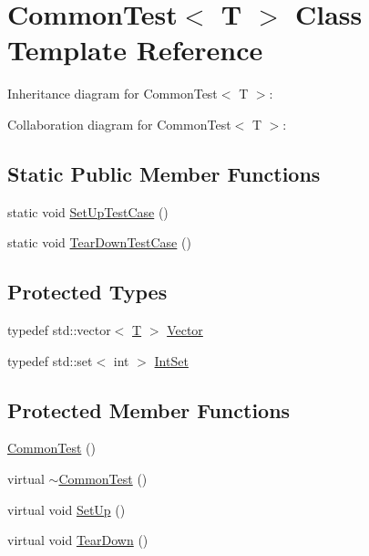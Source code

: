 \hypertarget{class_common_test}{}\section{Common\+Test$<$ T $>$ Class Template Reference}
\label{class_common_test}


Inheritance diagram for Common\+Test$<$ T $>$\+:


Collaboration diagram for Common\+Test$<$ T $>$\+:
\subsection*{Static Public Member Functions}
\begin{DoxyCompactItemize}
\item 
static void \hyperlink{class_common_test_a6edd90f32f45cc49e4a423b22bd770ce}{Set\+Up\+Test\+Case} ()
\item 
static void \hyperlink{class_common_test_a68d2bf5108cf28478331588fbdff4838}{Tear\+Down\+Test\+Case} ()
\end{DoxyCompactItemize}
\subsection*{Protected Types}
\begin{DoxyCompactItemize}
\item 
typedef std\+::vector$<$ \hyperlink{functions__7_8js_adf1f3edb9115acb0a1e04209b7a9937b}{T} $>$ \hyperlink{class_common_test_a6dfdcede6964887b9f4254a0e0478e37}{Vector}
\item 
typedef std\+::set$<$ int $>$ \hyperlink{class_common_test_a62827e9d3064cddf4a8698747f1bd434}{Int\+Set}
\end{DoxyCompactItemize}
\subsection*{Protected Member Functions}
\begin{DoxyCompactItemize}
\item 
\hyperlink{class_common_test_abd5ec205d90f4b81efab2a6f972f3db0}{Common\+Test} ()
\item 
virtual \hyperlink{class_common_test_a675a632fcf7b1fd961fefc619d6a458d}{$\sim$\+Common\+Test} ()
\item 
virtual void \hyperlink{class_common_test_a4c7bf7889ce48a9d06530bc4a437f3f5}{Set\+Up} ()
\item 
virtual void \hyperlink{class_common_test_aeae195c2cefa956c6ae5be1226e6ecd8}{Tear\+Down} ()
\end{DoxyCompactItemize}
